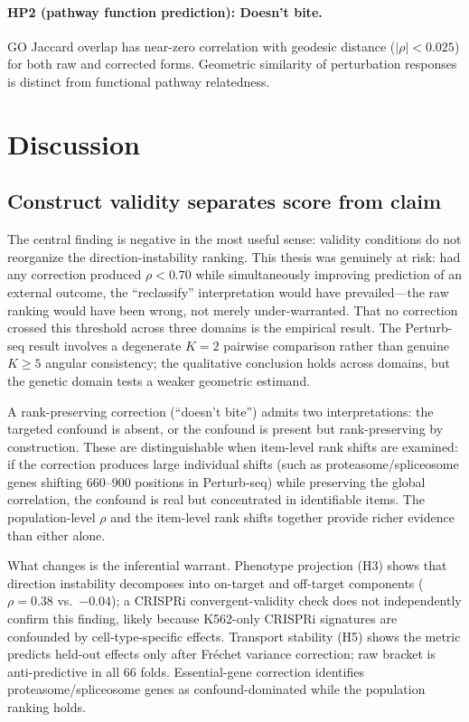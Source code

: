 \documentclass[10pt]{article}
\begin{document}
\paragraph{HP2 (pathway function prediction): Doesn't bite.}
GO Jaccard overlap has near-zero correlation with geodesic distance
($|\rho| < 0.025$) for both raw and corrected forms. Geometric similarity
of perturbation responses is distinct from functional pathway relatedness.

\section{Discussion}

\subsection{Construct validity separates score from claim}

The central finding is negative in the most useful sense: validity conditions
do not reorganize the direction-instability ranking. This thesis was
genuinely at risk: had any correction produced $\rho < 0.70$ while
simultaneously improving prediction of an external outcome, the
``reclassify'' interpretation would have prevailed---the raw ranking
would have been wrong, not merely under-warranted. That no correction
crossed this threshold across three domains is the empirical result.
The Perturb-seq result involves a degenerate $K = 2$ pairwise comparison
rather than genuine $K \geq 5$ angular consistency; the qualitative
conclusion holds across domains, but the genetic domain tests a weaker
geometric estimand.

A rank-preserving correction (``doesn't bite'') admits two
interpretations: the targeted confound is absent, or the confound is
present but rank-preserving by construction. These are distinguishable
when item-level rank shifts are examined: if the correction produces
large individual shifts (such as proteasome/spliceosome genes shifting
660--900 positions in Perturb-seq) while preserving the global
correlation, the confound is real but concentrated in identifiable items.
The population-level $\rho$ and the item-level rank shifts together
provide richer evidence than either alone.

What changes is the inferential warrant. Phenotype projection (H3) shows
that direction instability decomposes into on-target and off-target
components ($\rho = 0.38$ vs.\ $-0.04$); a CRISPRi convergent-validity
check does not independently confirm this finding, likely because
K562-only CRISPRi signatures are confounded by cell-type-specific
effects. Transport stability (H5) shows
the metric predicts held-out effects only after Fr\'{e}chet variance
correction; raw bracket is anti-predictive in all 66 folds. Essential-gene
correction identifies proteasome/spliceosome genes as confound-dominated
while the population ranking holds.
\end{document}
